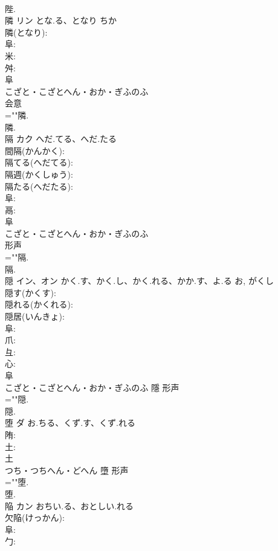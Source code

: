 \documentclass[8pt]{extreport}
\begin{document}
\begin{CJK}{UTF8}{min}
\\	陛.
\\	隣	リン	とな.る、となり	ちか	
\\	隣(となり): 
\\	阜: 
\\	米: 
\\	舛: 
\\	阜	
\\	こざと・こざとへん・おか・ぎふのふ	
\\	会意 
\\	=""隣.
\\	隣.
\\	隔	カク	へだ.てる、へだ.たる		
\\	間隔(かんかく): 
\\	隔てる(へだてる): 
\\	隔週(かくしゅう): 
\\	隔たる(へだたる): 
\\	阜: 
\\	鬲: 
\\	阜	
\\	こざと・こざとへん・おか・ぎふのふ	
\\	形声 
\\	=""隔.
\\	隔.
\\	隠	イン、オン	かく.す、かく.し、かく.れる、かか.す、よ.る	お, がくし	
\\	隠す(かくす): 
\\	隠れる(かくれる): 
\\	隠居(いんきょ): 
\\	阜: 
\\	爪: 
\\	彑: 
\\	心: 
\\	阜	
\\	こざと・こざとへん・おか・ぎふのふ	隱	形声 
\\	=""隠.
\\	隠.
\\	堕	ダ	お.ちる、くず.す、くず.れる		
\\	陏: 
\\	土: 
\\	土	
\\	つち・つちへん・どへん	墮	形声 
\\	=""堕.
\\	堕.
\\	陥	カン	おちい.る、おとしい.れる		
\\	欠陥(けっかん): 
\\	阜: 
\\	勹: 

\end{CJK}
\end{document}
